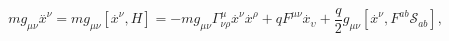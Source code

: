 \begin{equation}
mg_{\mu \nu }\stackrel{..}{x}^{\nu }=mg_{\mu \nu }\left[ \stackrel{.}{x}%
^{\nu },H\right] =-mg_{\mu \nu }\Gamma _{\nu \rho }^{\mu }\stackrel{.%
}{x}^{\nu }\stackrel{.}{x}^{\rho }+qF^{\mu \nu }\stackrel{.}{x}%
_{\upsilon }+\frac{q}{2}g_{\mu \nu }\left[ \stackrel{.}{x}^{\nu },F^{ab}%
\mathcal{S}_{ab}\right] ,
\end{equation}

